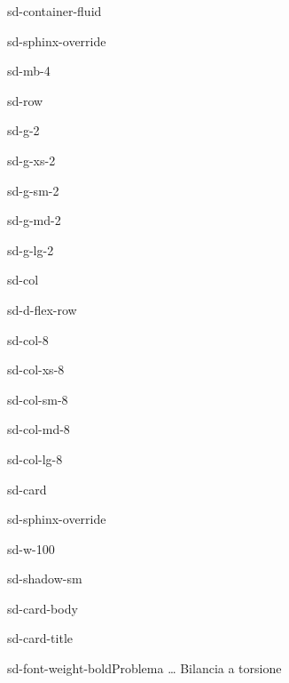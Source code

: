 \documentclass[letterpaper,10pt,italian]{jupyterBook}
\begin{document}
\begin{sphinxuseclass}{sd-container-fluid}
\begin{sphinxuseclass}{sd-sphinx-override}
\begin{sphinxuseclass}{sd-mb-4}
\begin{sphinxuseclass}{sd-row}
\begin{sphinxuseclass}{sd-g-2}
\begin{sphinxuseclass}{sd-g-xs-2}
\begin{sphinxuseclass}{sd-g-sm-2}
\begin{sphinxuseclass}{sd-g-md-2}
\begin{sphinxuseclass}{sd-g-lg-2}
\begin{sphinxuseclass}{sd-col}
\begin{sphinxuseclass}{sd-d-flex-row}
\begin{sphinxuseclass}{sd-col-8}
\begin{sphinxuseclass}{sd-col-xs-8}
\begin{sphinxuseclass}{sd-col-sm-8}
\begin{sphinxuseclass}{sd-col-md-8}
\begin{sphinxuseclass}{sd-col-lg-8}
\begin{sphinxuseclass}{sd-card}
\begin{sphinxuseclass}{sd-sphinx-override}
\begin{sphinxuseclass}{sd-w-100}
\begin{sphinxuseclass}{sd-shadow-sm}
\begin{sphinxuseclass}{sd-card-body}
\begin{sphinxuseclass}{sd-card-title}
\begin{sphinxuseclass}{sd-font-weight-bold}Problema … Bilancia a torsione
\end{sphinxuseclass}
\end{sphinxuseclass}
\end{sphinxuseclass}
\end{sphinxuseclass}
\end{sphinxuseclass}
\end{sphinxuseclass}
\end{sphinxuseclass}
\end{sphinxuseclass}
\end{sphinxuseclass}
\end{sphinxuseclass}
\end{sphinxuseclass}
\end{sphinxuseclass}
\end{sphinxuseclass}
\end{sphinxuseclass}

\end{sphinxuseclass}
\end{sphinxuseclass}
\end{sphinxuseclass}
\end{sphinxuseclass}
\end{sphinxuseclass}
\end{sphinxuseclass}
\end{sphinxuseclass}
\end{sphinxuseclass}
\end{sphinxuseclass}
\end{document}
